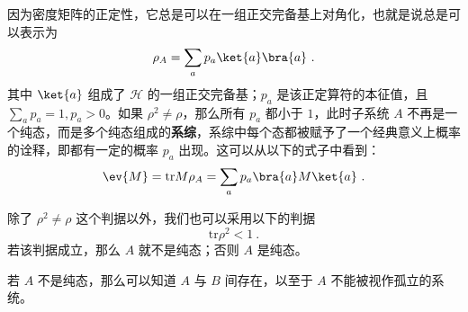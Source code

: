 因为密度矩阵的正定性，它总是可以在一组正交完备基上对角化，也就是说总是可以表示为
\begin{equation}
\rho_A=\sum_a p_a\ket{a}\bra{a}~.
\end{equation}
其中 $\ket{a}$ 组成了 $\mathcal{H}$ 的一组正交完备基；$p_a$ 是该正定算符的本征值，且 $\sum_a p_a=1,p_a>0$。如果 $\rho^2\neq \rho$，那么所有 $p_a$ 都小于 $1$，此时子系统 $A$ 不再是一个纯态，而是多个纯态组成的\textbf{系综}，系综中每个态都被赋予了一个经典意义上概率的诠释，即都有一定的概率 $p_a$ 出现。这可以从以下的式子中看到：
\begin{equation}
\ev{M}=\text{tr} M\rho_A = \sum_a p_a \bra{a}M\ket{a}~.
\end{equation}


除了 $\rho^2\neq \rho$ 这个判据以外，我们也可以采用以下的判据
\begin{equation}\label{eq_partra_2}
\text{tr} \rho^2 <1~.
\end{equation}
若该判据成立，那么 $A$ 就不是纯态；否则 $A$ 是纯态。

若 $A$ 不是纯态，那么可以知道 $A$ 与 $B$ 间存在，以至于 $A$ 不能被视作孤立的系统。
